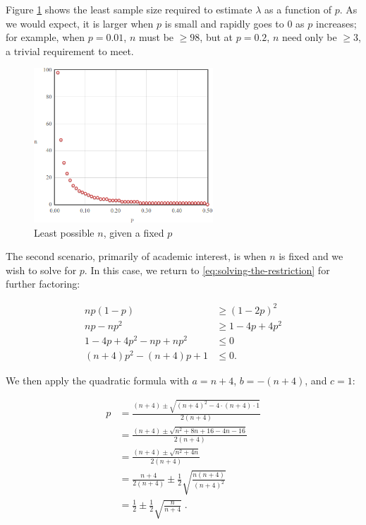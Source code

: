 \documentclass{article}
\begin{document}
Figure \ref{fig:sn-restriction-least-n} shows the least sample size required to
estimate $\lambda$ as a function of $p$. As we would expect, it is larger when
$p$ is small and rapidly goes to 0 as $p$ increases; for example, when $p =
0.01$, $n$ must be $\geq 98$, but at $p = 0.2$, $n$ need only be $\geq 3$, a
trivial requirement to meet.

\begin{figure}
  \centering
  \includegraphics[width=0.6\textwidth]{../images/restriction-least-n.png}
  \caption{Least possible $n$, given a fixed $p$}
  \label{fig:sn-restriction-least-n}
\end{figure}

The second scenario, primarily of academic interest, is when $n$ is fixed and
we wish to solve for $p$. In this case, we return to
\eqref{eq:solving-the-restriction} for further factoring:

\begin{align}
  np(1-p) &\geq (1-2p)^2 \nonumber \\
  np - np^2 &\geq 1 - 4p + 4p^2 \nonumber \\
  1 - 4p + 4p^2 - np + np^2 &\leq 0 \nonumber \\
  (n+4)p^2 - (n+4)p + 1 &\leq 0 \label{eq: solving for p}.
\end{align}

We then apply the quadratic formula with $a = n+4$, $b = -(n+4)$, and $c = 1$:

\begin{align*}
  p &= \frac{(n+4) \pm \sqrt{(n+4)^2 - 4 \cdot (n+4) \cdot 1}}{2(n+4)} \\
  &= \frac{(n+4) \pm \sqrt{n^2 + 8n + 16 - 4n - 16}}{2(n+4)} \\
  &= \frac{(n+4) \pm \sqrt{n^2 + 4n}}{2(n+4)} \\
  &= \frac{n+4}{2(n+4)} \pm \frac12 \sqrt{\frac{n(n+4)}{(n+4)^2}} \\
  &= \frac12 \pm \frac12 \sqrt{\frac{n}{n+4}} \;.
\end{align*}
\end{document}
